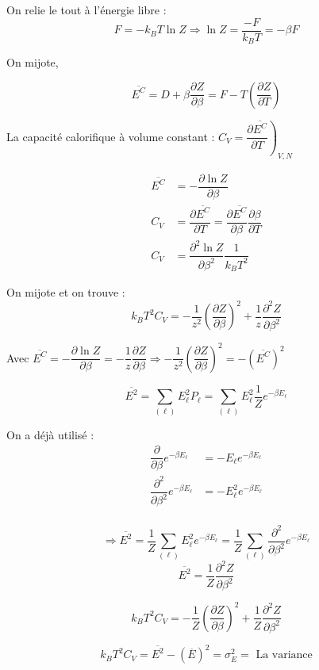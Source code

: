 \documentclass[12pt,a4paper]{report}
\begin{document}
On relie le tout à l'énergie libre :
\[
	F = -k_B T \ln Z \Rightarrow \ln Z = \dfrac{-F}{k_B T} = -\beta F
\]

On mijote,

\[
	\overline{E^C} = D + \beta  \dfrac{\partial Z}{\partial \beta} = F  - T\left(  \dfrac{\partial Z}{\partial T} \right)
\]

La capacité calorifique à volume constant : \(C_V = \left.  \dfrac{\partial \overline{E^C}}{\partial T} \right)_{V, N} \)

\begin{align*}
	\overline{E^C} &= - \dfrac{\partial \ln Z}{\partial \beta}\\
	C_V &= \dfrac{\partial \overline{E^C}}{\partial T} = \dfrac{\partial \overline{E^C}}{\partial \beta} \dfrac{\partial \beta}{\partial T}\\
	C_V &= \dfrac{\partial^2 \ln Z}{\partial \beta^2} \dfrac{1}{k_B T^2}
\end{align*}

On mijote et on trouve :
\[
	k_B T^2 C_V = -\dfrac{1}{z^2} \left( \dfrac{\partial Z}{\partial \beta} \right)^2 + \dfrac{1}{z} \dfrac{\partial^2 Z}{\partial \beta^2}
\]

Avec \( \overline{E^C} = - \dfrac{\partial \ln Z}{\partial \beta} = -\dfrac{1}{z}  \dfrac{\partial Z}{\partial \beta} \Rightarrow -\dfrac{1}{z^2} \left( \dfrac{\partial Z}{\partial \beta} \right)^2 = - \left( \overline{E^C} \right)^2 \)

\[
	\overline{E^2} = \sum_{(\ell)} E_\ell^2 P_\ell = \sum_{(\ell)} E_\ell^2 \dfrac{1}{Z} e^{-\beta E_\ell}
\]

On a déjà utilisé :
\begin{align*}
	\dfrac{\partial}{\partial \beta} e^{-\beta E_\ell} &= - E_\ell e^{-\beta E_\ell}\\
	\dfrac{\partial^2}{\partial \beta^2} e^{-\beta E_\ell} &= - E_\ell^2 e^{-\beta E_\ell}\\
\end{align*}

\[
	\Rightarrow \overline{E^2} = \dfrac{1}{Z} \sum_{(\ell)} E_\ell^2 e^{-\beta E_\ell} = \dfrac{1}{Z} \sum_{(\ell)} \dfrac{\partial^2}{\partial \beta^2} e^{-\beta E_\ell}
\]
\[
	\overline{E^2} =  \dfrac{1}{Z} \dfrac{\partial^2 Z}{\partial \beta^2}
\]

\[
	k_B T^2 C_V = -\dfrac{1}{Z} \left( \dfrac{\partial Z}{\partial \beta}\right)^2 + \dfrac{1}{Z} \dfrac{\partial^2 Z}{\partial \beta^2}
\]

\[
	k_B T^2 C_V = \overline{E^2} - \left(\overline{E}\right)^2 = \sigma_E^2 = \text{ La variance}
\]
\end{document}
